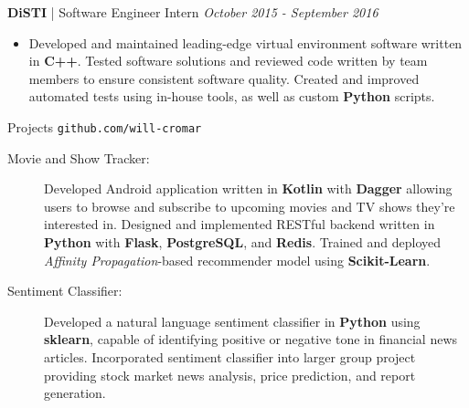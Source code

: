 \documentclass[letterpaper,11pt,oneside]{article}
\newcommand{\resheader}[2][]{
  \vspace{9pt}
  {\LARGE #2} #1
  \\
}
\newcommand{\ressubheader}[3][]{
  \vspace{6pt}
  {\large \textbf{#2} #1} \hfill \emph{#3}
  \\
}
\newcommand{\resskill}[1]{\textbf{#1}}
\begin{document}
\ressubheader[| Software Engineer Intern]{DiSTI}{October 2015 - September 2016}
\begin{itemize}
  \item Developed and maintained leading-edge virtual environment software written in \resskill{C++}. Tested software solutions and reviewed code written by team members to ensure consistent software quality. Created and improved automated tests using in-house tools, as well as custom \resskill{Python} scripts.
\end{itemize}

\resheader[\hfill \texttt{github.com/will-cromar}]{Projects}
\begin{description}
  \item [Movie and Show Tracker:] Developed Android application written in \resskill{Kotlin} with \resskill{Dagger} allowing users to browse and subscribe to upcoming movies and TV shows they're interested in. Designed and implemented RESTful backend written in \resskill{Python} with \resskill{Flask}, \resskill{PostgreSQL}, and \resskill{Redis}. Trained and deployed \emph{Affinity Propagation}-based recommender model using \resskill{Scikit-Learn}.
   \item [Sentiment Classifier:] Developed a natural language sentiment classifier in \resskill{Python} using \resskill{sklearn}, capable of identifying positive or negative tone in financial news articles. Incorporated sentiment classifier into larger group project providing stock market news analysis, price prediction, and report generation.
\end{description}    
\end{document}
